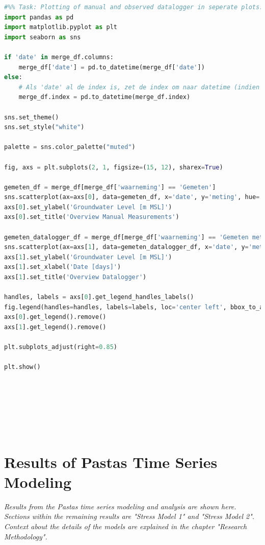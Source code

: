 \begin{lstlisting}[language=Python]
#%% Task: Plotting of manual and observed datalogger in seperate plots.
import pandas as pd
import matplotlib.pyplot as plt
import seaborn as sns

if 'date' in merge_df.columns:
    merge_df['date'] = pd.to_datetime(merge_df['date'])
else:
    # Als 'date' al de index is, zet de index om naar datetime (indien nodig)
    merge_df.index = pd.to_datetime(merge_df.index)

sns.set_theme()
sns.set_style("white")

palette = sns.color_palette("muted")

fig, axs = plt.subplots(2, 1, figsize=(15, 12), sharex=True)

gemeten_df = merge_df[merge_df['waarneming'] == 'Gemeten']
sns.scatterplot(ax=axs[0], data=gemeten_df, x='date', y='meting', hue='meetpunt', s=10, palette=palette)
axs[0].set_ylabel('Groundwater Level [m MSL]')
axs[0].set_title('Overview Manual Measurements')

gemeten_datalogger_df = merge_df[merge_df['waarneming'] == 'Gemeten met datalogger']
sns.scatterplot(ax=axs[1], data=gemeten_datalogger_df, x='date', y='meting', hue='meetpunt', s=10, palette=palette)
axs[1].set_ylabel('Groundwater Level [m MSL]')
axs[1].set_xlabel('Date [days]')
axs[1].set_title('Overview Datalogger')

handles, labels = axs[0].get_legend_handles_labels()
fig.legend(handles=handles, labels=labels, loc='center left', bbox_to_anchor=(1.02, 0.5), title='Meetpunt')
axs[0].get_legend().remove()  
axs[1].get_legend().remove()  

plt.subplots_adjust(right=0.85)  

plt.show()








\end{lstlisting}

















\newpage
\section{Results of Pastas Time Series Modeling}
\emph{Results from the Pastas time series modeling and analysis are shown here. Sections within the remaining results are "Stress Model 1" and "Stress Model 2". Context about the details of the models are explained in the chapter "Research Methodology".}

